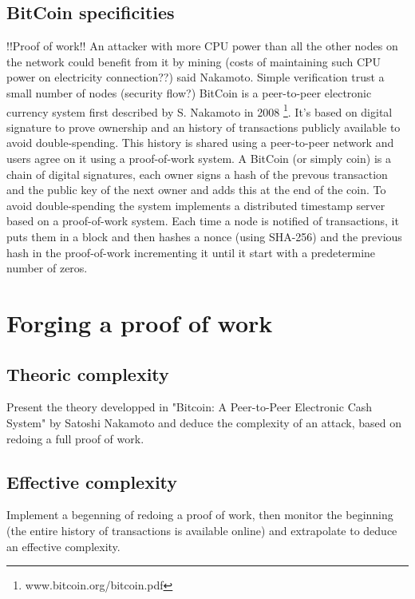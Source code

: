 \documentclass{acm_proc_article-sp}
\begin{document}
\subsection{BitCoin specificities}
!!Proof of work!!
An attacker with more CPU power than all the other nodes on the network
could benefit from it by mining (costs of maintaining such CPU
power on electricity connection??) said Nakamoto. Simple verification 
trust a small number of nodes (security flow?)
BitCoin is a peer-to-peer electronic currency system first described
by S. Nakamoto in 2008 \footnote{www.bitcoin.org/bitcoin.pdf}. It's based on
digital signature to prove ownership and an history of transactions publicly 
available to avoid double-spending. This history is shared using a peer-to-peer 
network and users agree on it using a proof-of-work system.
A BitCoin (or simply coin) is a chain of digital signatures, each owner signs
a hash of the prevous transaction and the public key of the next owner and 
adds this at the end of the coin. To avoid double-spending the system implements
a distributed timestamp server based on a proof-of-work system. Each time a 
node is notified of transactions, it puts them in a block and then hashes a
nonce (using SHA-256) and the previous hash in the proof-of-work incrementing 
it until it start with a predetermine number of zeros.     


\section{Forging a proof of work}
\subsection{Theoric complexity}
Present the theory developped in "Bitcoin: A Peer-to-Peer Electronic Cash System" by Satoshi Nakamoto and deduce the complexity of
an attack, based on redoing a full proof of work.

\subsection{Effective complexity}
Implement a begenning of redoing a proof of work, then monitor the 
beginning (the entire history of transactions is available online)
and extrapolate to deduce an effective complexity.
\end{document}
